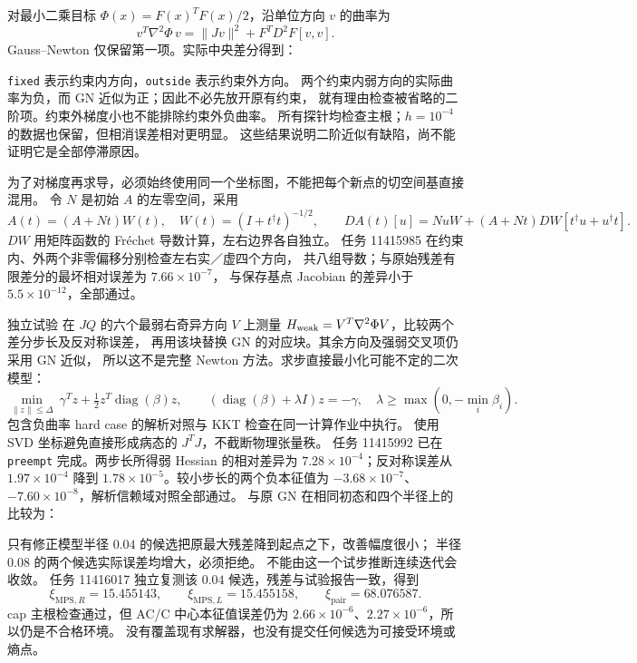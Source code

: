 \documentclass[11pt]{article}
\newcommand{\diag}{\operatorname{diag}}
\newcommand{\code}[1]{{\small\texttt{#1}}}
\begin{document}
对最小二乘目标 $\Phi(x)=F(x)^T F(x)/2$，沿单位方向 $v$ 的曲率为
\begin{equation}
 v^T\nabla^2\Phi\,v=\|Jv\|^2+F^T D^2F[v,v].
\end{equation}
Gauss--Newton 仅保留第一项。实际中央差分得到：
\begin{center}\small

\end{center}
\code{fixed} 表示约束内方向，\code{outside} 表示约束外方向。
两个约束内弱方向的实际曲率为负，而 GN 近似为正；因此不必先放开原有约束，
就有理由检查被省略的二阶项。约束外梯度小也不能排除约束外负曲率。
所有探针均检查主根；$h=10^{-4}$ 的数据也保留，但相消误差相对更明显。
这些结果说明二阶近似有缺陷，尚不能证明它是全部停滞原因。

为了对梯度再求导，必须始终使用同一个坐标图，不能把每个新点的切空间基直接混用。
令 $N$ 是初始 $A$ 的左零空间，采用
\begin{equation}
 A(t)=(A+Nt)W(t),\quad W(t)=(I+t^\dagger t)^{-1/2},\qquad
 DA(t)[u]=NuW+(A+Nt)DW[t^\dagger u+u^\dagger t].
\end{equation}
$DW$ 用矩阵函数的 Fr\'echet 导数计算，左右边界各自独立。
任务 11415985 在约束内、外两个非零偏移分别检查左右实／虚四个方向，
共八组导数；与原始残差有限差分的最坏相对误差为 $7.66\times10^{-7}$，
与保存基点 Jacobian 的差异小于 $5.5\times10^{-12}$，全部通过。

独立试验 
在 $JQ$ 的六个最弱右奇异方向 $V$ 上测量
$H_{\rm weak}=V^T\nabla^2\Phi V$，比较两个差分步长及反对称误差，
再用该块替换 GN 的对应块。其余方向及强弱交叉项仍采用 GN 近似，
所以这不是完整 Newton 方法。求步直接最小化可能不定的二次模型：
\begin{equation}
 \min_{\|z\|\leq\Delta}\ \gamma^Tz+\tfrac12 z^T\diag(\beta)z,
 \qquad (\diag(\beta)+\lambda I)z=-\gamma,\quad
 \lambda\geq\max(0,-\min_i\beta_i).
\end{equation}
包含负曲率 hard case 的解析对照与 KKT 检查在同一计算作业中执行。
使用 SVD 坐标避免直接形成病态的 $J^TJ$，不截断物理张量秩。
任务 11415992 已在 \code{preempt} 完成。两步长所得弱 Hessian 的相对差异为
$7.28\times10^{-4}$；反对称误差从 $1.97\times10^{-4}$ 降到
$1.78\times10^{-5}$。较小步长的两个负本征值为
$-3.68\times10^{-7}$、$-7.60\times10^{-8}$，解析信赖域对照全部通过。
与原 GN 在相同初态和四个半径上的比较为：
\begin{center}\small

\end{center}
只有修正模型半径 $0.04$ 的候选把原最大残差降到起点之下，改善幅度很小；
半径 $0.08$ 的两个候选实际误差均增大，必须拒绝。
不能由这一个试步推断连续迭代会收敛。
任务 11416017 独立复测该 $0.04$ 候选，残差与试验报告一致，得到
\begin{equation}
 \xi_{\mathrm{MPS},R}=15.455143,\qquad
 \xi_{\mathrm{MPS},L}=15.455158,\qquad
 \xi_{\mathrm{pair}}=68.076587.
\end{equation}
cap 主根检查通过，但 AC/C 中心本征值误差仍为
$2.66\times10^{-6}$、$2.27\times10^{-6}$，所以仍是不合格环境。
没有覆盖现有求解器，也没有提交任何候选为可接受环境或熵点。
\end{document}
